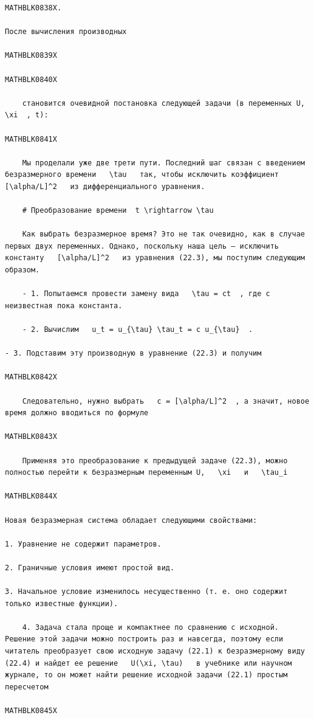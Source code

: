 \documentclass[
]{article}
\begin{document}
\begin{verbatim}
MATHBLK0838X.

После вычисления производных

MATHBLK0839X

MATHBLK0840X

    становится очевидной постановка следующей задачи (в переменных U,   \xi  , t):

MATHBLK0841X

    Мы проделали уже две трети пути. Последний шаг связан с введением безразмерного времени   \tau   так, чтобы исключить коэффициент   [\alpha/L]^2   из дифференциального уравнения.

    # Преобразование времени  t \rightarrow \tau 

    Как выбрать безразмерное время? Это не так очевидно, как в случае первых двух переменных. Однако, поскольку наша цель — исключить константу   [\alpha/L]^2   из уравнения (22.3), мы поступим следующим образом.

    - 1. Попытаемся провести замену вида   \tau = ct  , где c неизвестная пока константа.

    - 2. Вычислим   u_t = u_{\tau} \tau_t = c u_{\tau}  .

- 3. Подставим эту производную в уравнение (22.3) и получим

MATHBLK0842X

    Следовательно, нужно выбрать   c = [\alpha/L]^2  , а значит, новое время должно вводиться по формуле

MATHBLK0843X

    Применяя это преобразование к предыдущей задаче (22.3), можно полностью перейти к безразмерным переменным U,   \xi   и   \tau_i 

MATHBLK0844X

Новая безразмерная система обладает следующими свойствами:

1. Уравнение не содержит параметров.

2. Граничные условия имеют простой вид.

3. Начальное условие изменилось несущественно (т. е. оно содержит только известные функции).

    4. Задача стала проще и компактнее по сравнению с исходной. Решение этой задачи можно построить раз и навсегда, поэтому если читатель преобразует свою исходную задачу (22.1) к безразмерному виду (22.4) и найдет ее решение   U(\xi, \tau)   в учебнике или научном журнале, то он может найти решение исходной задачи (22.1) простым пересчетом

MATHBLK0845X


\end{verbatim}
\end{document}
